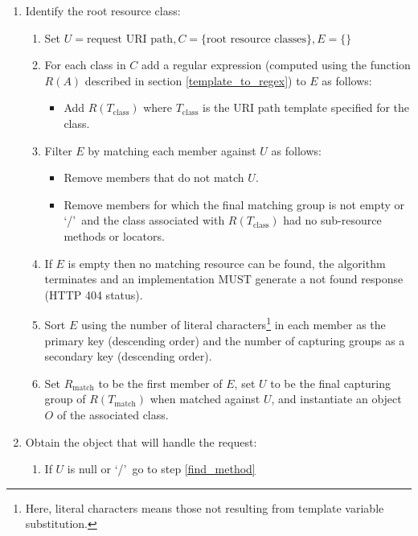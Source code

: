 \begin{enumerate}
\item Identify the root resource class:

\begin{enumerate}
\item Set $U=\mbox{request URI path}, C=\{\mbox{root resource classes}\}, E=\{\}$

\item For each class in $C$ add a regular expression (computed using the function $R(A)$ described in section \ref{template_to_regex}) to $E$ as follows:
\begin{itemize}
\item Add $R(T_{\mbox{class}})$ where $T_{\mbox{class}}$ is the URI path template specified for the class.
\end{itemize}

\item Filter $E$ by matching each member against $U$ as follows:
\begin{itemize}
\item Remove members that do not match $U$.
\item Remove members for which the final matching group is not empty or \lq/\rq\ and the class associated with $R(T_{\mbox{class}})$ had no sub-resource methods or locators.
\end{itemize}

\item If $E$ is empty then no matching resource can be found, the algorithm terminates and an implementation MUST generate a not found response (HTTP 404 status).

\item Sort $E$ using the number of literal characters\footnote{Here, literal characters means those not resulting from template variable substitution.} in each member as the primary key (descending order) and the number of capturing groups as a secondary key (descending order).

\item Set $R_{\mbox{match}}$ to be the first member of $E$, set $U$ to be the final capturing group of $R(T_{\mbox{match}})$ when matched against $U$, and instantiate an object $O$ of the associated class.

\end{enumerate}

\item \label{find_object} Obtain the object that will handle the request:

\begin{enumerate}
\item \label{check_null} If $U$ is null or \lq/\rq\ go to step \ref{find_method}


\end{enumerate}
\end{enumerate}
